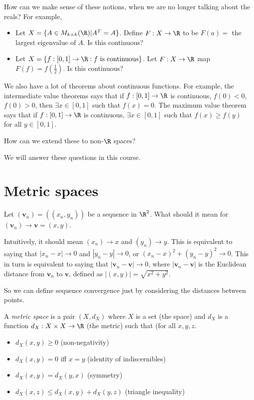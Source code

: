 \documentclass[a4paper]{article}
\begin{document}
How can we make sense of these notions, when we are no longer talking about the reals? For example,
\begin{itemize}
  \item Let $X = \{A \in M_{k\times k}(\R) | A^T = A\}$. Define $F: X\to \R$ to be $F(a) =$ the largest eigenvalue of $A$. Is this continuous?

  \item Let $X = \{f: [0, 1]\to \R: f\text{ is continuous}\}$. Let $F: X \to \R$ map $F(f) = f(\frac{1}{2})$. Is this continuous?
\end{itemize}

We also have a lot of theorems about continuous functions. For example, the intermediate value theorems says that if $f:[0, 1] \to \R$ is continuous, $f(0) < 0$, $f(0) > 0$, then $\exists x\in [0, 1]$ such that $f(x) = 0$.  The maximum value theorem says that if $f:[0, 1] \to \R$ is continuous, $\exists x\in [0, 1]$ such that $f(x) \geq f(y)$ for all $y\in [0, 1]$.

How can we extend these to non-$\R$ spaces?

We will answer these questions in this course.

\section{Metric spaces}
Let $(\mathbf{v}_n) = ((x_n, y_n))$ be a sequence in $\R^2$. What should it mean for $(\mathbf{v}_n) \to \mathbf{v} = (x, y)$.

Intuitively, it should mean $(x_n) \to x$ and $(y_n) \to y$. This is equivalent to saying that $|x_n - x| \to 0$ and $|y_n - y| \to 0$, or $(x_n - x)^2 + (y_n - y)^2 \to 0$. This in turn is equivalent to saying that $|\mathbf{v}_n - \mathbf{v}| \to 0$, where $|\mathbf{v}_n - \mathbf{v}|$ is the Euclidean distance from $\mathbf{v}_n$ to $\mathbf{v}$, defined as $|(x, y)| = \sqrt{x^2 + y^2}$.

So we can define sequence convergence just by considering the distances between points.
\begin{defi}
  A \emph{metric space} is a pair $(X, d_X)$ where $X$ is a set (the space) and $d_X$ is a function $d_X: X \times X \to \R$ (the metric) such that (for all $x, y, z$.
  \begin{itemize}
    \item $d_X(x, y) \geq 0$ (non-negativity)
    \item $d_X(x, y) = 0$ iff $x = y$ (identity of indiscernibles)
    \item $d_X(x, y) = d_X(y, x)$ (symmetry) \item $d_X(x, z) \leq d_X(x, y) + d_X(y, z)$ (triangle inequality)
  \end{itemize}
\end{defi}
\end{document}
